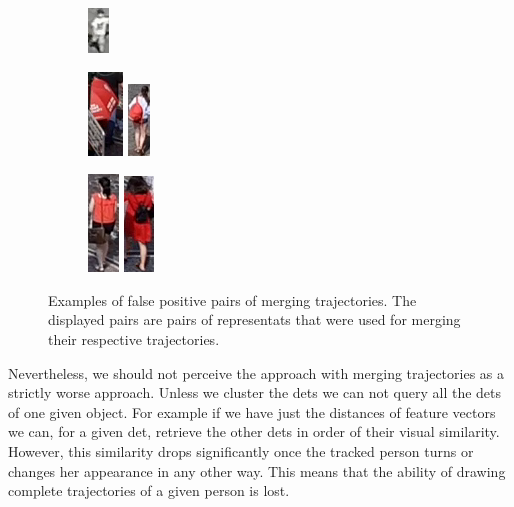\begin{figure}
\begin{subfigure}[b]{0.3\textwidth}
         \includegraphics[height=\fpheight]{img/fp_3_b.png}
    \end{subfigure}
    \begin{subfigure}[b]{0.3\textwidth}
         \centering
         \includegraphics[height=\fpheight]{img/fp_4_a.png}
         \includegraphics[height=\fpheight]{img/fp_4_b.png}
    \end{subfigure}
    \begin{subfigure}[b]{0.3\textwidth}
         \centering
         \includegraphics[height=\fpheight]{img/fp_5_a.png}
         \includegraphics[height=\fpheight]{img/fp_5_b.png}
    \end{subfigure}
    \caption[Examples of false positive pairs of merging trajectories]{Examples of false positive pairs of merging trajectories. The displayed pairs are pairs of representats that were used for merging their respective trajectories.}
    \label{fig:fp_pairs}

\end{figure}
Nevertheless, we should not perceive the approach with merging trajectories as a strictly worse approach. Unless we cluster the \glspl{det} we can not query all the \glspl{det} of one given object. For example if we have just the distances of feature vectors we can, for a given \gls{det}, retrieve the other \glspl{det} in order of their visual similarity. However, this similarity drops significantly once the tracked person turns or changes her appearance in any other way. This means that the ability of drawing complete trajectories of a given person is lost.

